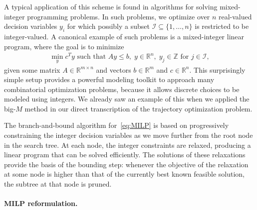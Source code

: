 \documentclass[a4paper]{report}
\theoremstyle{definition}
\theoremstyle{plain}
\begin{document}
A typical application of this scheme is found in algorithms for solving
mixed-integer programming problems.
%
In such problems, we optimize over $n$ real-valued decision variables $y_{i}$
for which possibly a subset $\mathcal{I} \subseteq \{1, \dots, n\}$ is
restricted to be integer-valued.
%
A canonical example of such problems is a mixed-integer linear program, where the
goal is to minimize
\begin{align}\label{eq:MILP}\tag{MILP}
  \min_{y} c^{T} y \text{ such that } Ay \leq b, \; y \in \mathbb{R}^{n}, \; y_{j} \in \mathbb{Z} \text{ for } j \in \mathcal{I},
\end{align}
given some matrix $A \in \mathbb{R}^{m\times n}$ and vectors
$b \in \mathbb{R}^{m}$ and $c \in \mathbb{R}^{n}$.
%
This surprisingly simple setup provides a powerful modeling toolkit to approach
many combinatorial optimization problems, because it allows discrete choices to
be modeled using integers.
%
We already saw an example of this when we applied the big-$M$ method in our
direct transcription of the trajectory optimization problem.

The branch-and-bound algorithm for~\eqref{eq:MILP} is based on progressively
constraining the integer decision variables as we move further from the root
node in the search tree.
%
At each node, the integer constraints are relaxed, producing a linear program
that can be solved efficiently.
%
The solutions of these relaxations provide the basis of the bounding step:
whenever the objective of the relaxation at some node is higher than that of the
currently best known feasible solution, the subtree at that node is pruned.

\paragraph{MILP reformulation.}
\end{document}
